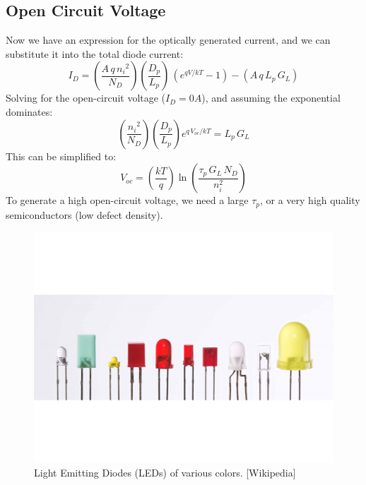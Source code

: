\newpage
\subsection{Open Circuit Voltage}
Now we have an expression for the optically generated current, and we can substitute it into the total diode current:
    \begin{equation} 
        I_D = \left( \frac{A\,q\,{n_i}^2}{N_D} \right) \left( \frac{D_p}{L_p} \right)\,\left( e^{qV/kT} - 1 \right) - (A\,q\,L_p\,G_L) 
    \end{equation}
Solving for the open-circuit voltage ($I_D = 0A$), and assuming the exponential dominates:
    \begin{equation} 
        \left( \frac{{n_i}^2}{N_D} \right) \left( \frac{D_p}{L_p} \right) e^{q\,V_{oc}/kT} = L_p\,G_L
    \end{equation}
This can be simplified to:
    \begin{equation} 
        V_{oc} = \left( \frac{kT}{q} \right) \ln \left( \frac{\tau_p\,G_L\,N_D}{n_i^2} \right)
    \end{equation}
To generate a high open-circuit voltage, we need a large $\tau_p$, or a very high quality semiconductors (low defect density).
\begin{figure}[t]
\centering
\includegraphics[width=\columnwidth]{led}
\caption{Light Emitting Diodes (LEDs) of various colors. [Wikipedia]}
\label{fig:led}
\end{figure}
